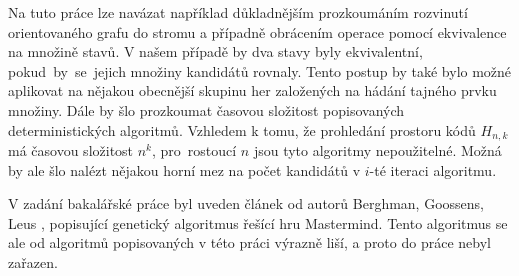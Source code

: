 
Na tuto práce lze navázat například důkladnějším prozkoumáním rozvinutí orientovaného grafu do stromu a případně obrácením operace pomocí ekvivalence na množině stavů. V našem případě by dva stavy byly ekvivalentní, pokud~by~se~jejich množiny kandidátů rovnaly. Tento postup by také bylo možné aplikovat na nějakou obecnější skupinu her založených na hádání tajného prvku množiny. Dále by šlo prozkoumat časovou složitost popisovaných deterministických algoritmů. Vzhledem k tomu, že prohledání prostoru kódů $H_{n,k}$ má časovou složitost $n^k$, pro~rostoucí $n$ jsou tyto algoritmy nepoužitelné. Možná by ale šlo nalézt nějakou horní mez na počet kandidátů v $i$-té iteraci algoritmu. 


V zadání bakalářské práce byl uveden článek od autorů Berghman, Goossens, Leus \cite{BERGHMAN20091880}, popisující genetický algoritmus řešící hru Mastermind. Tento algoritmus se ale od algoritmů popisovaných v této práci výrazně liší, a proto do práce nebyl zařazen. 

